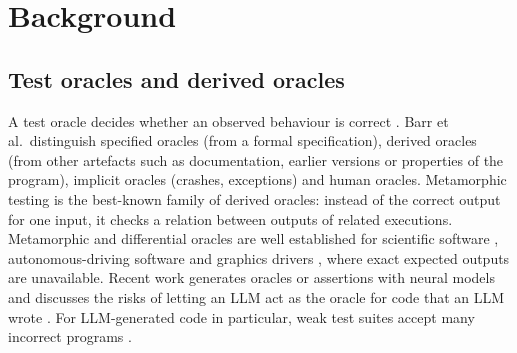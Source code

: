 \section{Background}\label{sec:background}

\subsection{Test oracles and derived oracles}
A test oracle decides whether an observed behaviour is correct \citep{barr2015oracle}. Barr et al.\ distinguish specified oracles (from a formal specification), derived oracles (from other artefacts such as documentation, earlier versions or properties of the program), implicit oracles (crashes, exceptions) and human oracles. Metamorphic testing \citep{chen2018metamorphic,segura2016survey} is the best-known family of derived oracles: instead of the correct output for one input, it checks a relation between outputs of related executions. Metamorphic and differential oracles are well established for scientific software \citep{kanewala2014scientific}, autonomous-driving software \citep{zhou2019driverless} and graphics drivers \citep{donaldson2017shader}, where exact expected outputs are unavailable. Recent work generates oracles or assertions with neural models \citep{dinella2022toga,hossain2023neural} and discusses the risks of letting an LLM act as the oracle for code that an LLM wrote \citep{molina2025oracle}. For LLM-generated code in particular, weak test suites accept many incorrect programs \citep{liu2023evalplus}.

